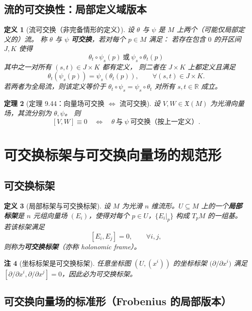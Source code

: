 \documentclass[11pt]{article}
\newtheorem{definition}{定义}[section]
\newtheorem{theorem}[definition]{定理}
\newtheorem{remark}[definition]{注}
\newcommand{\R}{\mathbb{R}}
\newcommand{\X}{\mathfrak{X}}
\begin{document}
\subsection{流的可交换性：局部定义域版本}

\begin{definition}[流可交换（非完备情形的定义）]
设 $\theta$ 与 $\psi$ 是 $M$ 上两个（可能仅局部定义的）流。
称 $\theta$ 与 $\psi$ \textbf{可交换}，若对每个 $p\in M$ 满足：
若存在包含 $0$ 的开区间 $J,K$ 使得
\[
\theta_t\circ\psi_s(p)\ \text{或}\ \psi_s\circ\theta_t(p)
\]
其中之一对所有 $(s,t)\in J\times K$ 都有定义，
则二者在 $J\times K$ 上都定义且满足
\[
\theta_t(\psi_s(p))=\psi_s(\theta_t(p)),\qquad \forall (s,t)\in J\times K.
\]
若两者为全局流，则该定义等价于
$\theta_t\circ\psi_s=\psi_s\circ\theta_t$ 对所有 $s,t\in\R$ 成立。
\end{definition}

\begin{theorem}[定理 9.44：向量场可交换 $\Longleftrightarrow$ 流可交换]
设 $V,W\in\X(M)$ 为光滑向量场，其流分别为 $\theta,\psi$。
则
\[
[V,W]\equiv 0
\quad\Longleftrightarrow\quad
\theta\ \text{与}\ \psi\ \text{可交换（按上一定义）}.
\]
\end{theorem}

\section{可交换标架与可交换向量场的规范形}

\subsection{可交换标架}

\begin{definition}[局部标架与可交换标架]
设 $M$ 为光滑 $n$ 维流形。$U\subseteq M$ 上的一个\textbf{局部标架}是
$n$ 元组向量场 $(E_i)$，使得对每个 $p\in U$，$\{E_i|_p\}$ 构成 $T_pM$ 的一组基。
若该标架满足
\[
[E_i,E_j]=0,\qquad \forall i,j,
\]
则称为\textbf{可交换标架}（亦称 holonomic frame）。
\end{definition}

\begin{remark}[坐标标架是可交换标架]
任意坐标图 $(U,(x^i))$ 的坐标标架 $\bigl(\partial/\partial x^i\bigr)$ 满足
$[\partial/\partial x^i,\partial/\partial x^j]=0$，因此必为可交换标架。
\end{remark}

\subsection{可交换向量场的标准形（Frobenius 的局部版本）}
\end{document}
